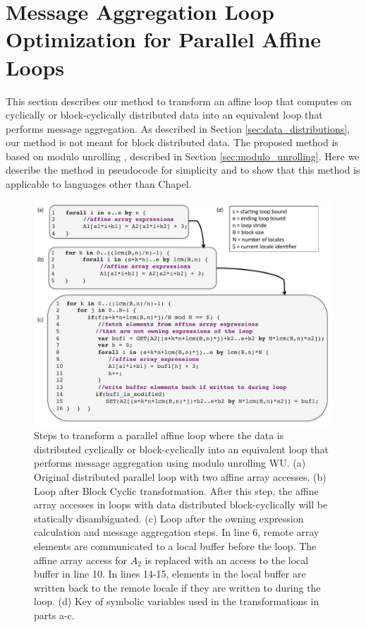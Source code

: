 \section{Message Aggregation Loop Optimization for Parallel Affine Loops}\label{sec:transformation} 

This section describes our method to transform an affine loop that computes on cyclically or block-cyclically distributed data into an equivalent loop that performs message aggregation. As described in Section \ref{sec:data_distributions}, our method is not meant for block distributed data. The proposed method is based on modulo unrolling \cite{barua1999maps}, described in Section \ref{sec:modulo_unrolling}. Here we describe the method in pseudocode for simplicity and to show that this method is applicable to languages other than Chapel. 

\begin{figure}
\begin{center}
\includegraphics[width=\linewidth]{./Figures/transformations}
\caption{Steps to transform a parallel affine loop where the data is distributed cyclically or block-cyclically into an equivalent loop that performs message aggregation using modulo unrolling WU. (a) Original distributed parallel loop with two affine array accesses. (b) Loop after Block Cyclic transformation. After this step, the affine array accesses in loops with data distributed block-cyclically will be statically disambiguated. (c) Loop after the owning expression calculation and message aggregation steps. In line 6, remote array elements are communicated to a local buffer before the loop. The affine array access for $A_{2}$ is replaced with an access to the local buffer in line 10. In lines 14-15, elements in the local buffer are written back to the remote locale if they are written to during the loop. (d) Key of symbolic variables used in the transformations in parts a-c. }
\label{transformations}
\end{center}
\end{figure}

